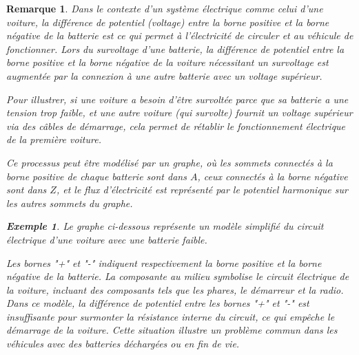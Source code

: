 \documentclass{article}
\theoremstyle{pasdepoint}
\theoremstyle{break}
\newtheorem{example}{Exemple}
\theoremstyle{pasdepoint}
\newtheorem*{remark}{Remarque}
\begin{document}
\begin{remark}
    Dans le contexte d'un système électrique comme celui d'une voiture, la différence de potentiel (voltage) entre la borne positive et la borne négative de la batterie est ce qui permet à l'électricité de circuler et au véhicule de fonctionner. Lors du survoltage d'une batterie, la différence de potentiel entre la borne positive et la borne négative de la voiture nécessitant un survoltage est augmentée par la connexion à une autre batterie avec un voltage supérieur. 

    Pour illustrer, si une voiture a besoin d'être survoltée parce que sa batterie a une tension trop faible, et une autre voiture (qui survolte) fournit un voltage supérieur via des câbles de démarrage, cela permet de rétablir le fonctionnement électrique de la première voiture. 

    Ce processus peut être modélisé par un graphe, où les sommets connectés à la borne positive de chaque batterie sont dans \(A\), ceux connectés à la borne négative sont dans \(Z\), et le flux d'électricité est représenté par le potentiel harmonique sur les autres sommets du graphe.

    \begin{example}
        Le graphe ci-dessous représente un modèle simplifié du circuit électrique d'une voiture avec une batterie faible.
        
        Les bornes "+" et "-" indiquent respectivement la borne positive et la borne négative de la batterie. La composante au milieu symbolise le circuit électrique de la voiture, incluant des composants tels que les phares, le démarreur et la radio. Dans ce modèle, la différence de potentiel entre les bornes "+" et "-" est insuffisante pour surmonter la résistance interne du circuit, ce qui empêche le démarrage de la voiture. Cette situation illustre un problème commun dans les véhicules avec des batteries déchargées ou en fin de vie.
        \begin{center}
        \end{center}
            


\end{example}
\end{remark}
\end{document}
